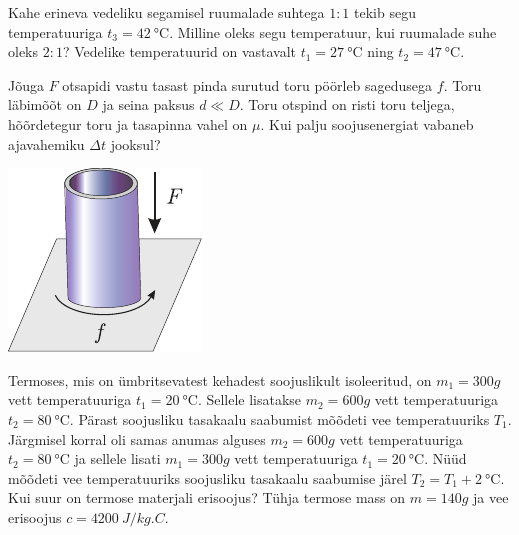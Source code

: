 \documentclass[10pt]{article}
\begin{document}
{
Kahe erineva vedeliku segamisel ruumalade suhtega $1 : 1$ tekib segu temperatuuriga $t_3 = \SI{42}{\degreeCelsius}$. Milline oleks segu temperatuur, kui ruumalade suhe oleks $2 : 1$? Vedelike temperatuurid on vastavalt $t_1 = \SI{27}{\degreeCelsius}$ ning $t_2 = \SI{47}{\degreeCelsius}$.
\probend
\bigskip


Jõuga $F$ otsapidi vastu tasast pinda surutud toru pöörleb sagedusega $f$. Toru läbimõõt on $D$ ja seina paksus $d \ll D$. Toru otspind on risti toru teljega, hõõrdetegur toru ja tasapinna vahel on $\mu$. Kui palju soojusenergiat vabaneb ajavahemiku $\Delta t$ jooksul?

\begin{center}
	\includegraphics[width=0.3\linewidth]{2008-v2g-03-yl}
\end{center}
\probend
\bigskip


Termoses, mis on ümbritsevatest kehadest soojuslikult isoleeritud, on $m_1 = \SI{300}g$ vett temperatuuriga $t_1 = \SI{20}{\degreeCelsius}$. Sellele lisatakse $m_2 = \SI{600}g$ vett temperatuuriga $t_2 = \SI{80}{\degreeCelsius}$. Pärast soojusliku
tasakaalu saabumist mõõdeti vee temperatuuriks $T_1$. Järgmisel korral oli
samas anumas alguses $m_2 = \SI{600}g$ vett temperatuuriga $t_2 = \SI{80}{\degreeCelsius}$ ja sellele lisati $m_1 = \SI{300}g$ vett temperatuuriga $t_1 = \SI{20}{\degreeCelsius}$. Nüüd mõõdeti vee temperatuuriks soojusliku tasakaalu saabumise järel $T_2 = T_1+\SI{2}{\degreeCelsius}$. Kui
suur on termose materjali erisoojus? Tühja termose mass on $m = \SI{140}g$ ja vee erisoojus $c = \SI{4200}{J/kg.C}$.
\probend
\bigskip


}
\end{document}
